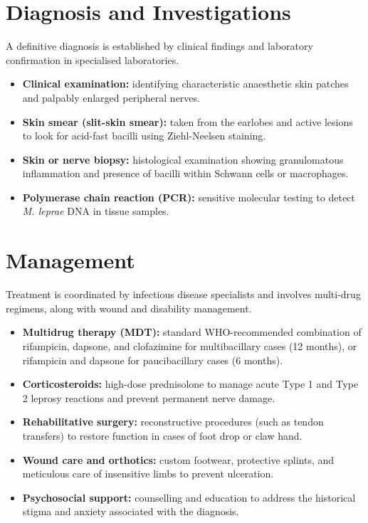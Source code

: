 \section*{Diagnosis and Investigations}
A definitive diagnosis is established by clinical findings and laboratory confirmation in specialised laboratories.
\begin{itemize}
    \item \textbf{Clinical examination:} identifying characteristic anaesthetic skin patches and palpably enlarged peripheral nerves.
    \item \textbf{Skin smear (slit-skin smear):} taken from the earlobes and active lesions to look for acid-fast bacilli using Ziehl-Neelsen staining.
    \item \textbf{Skin or nerve biopsy:} histological examination showing granulomatous inflammation and presence of bacilli within Schwann cells or macrophages.
    \item \textbf{Polymerase chain reaction (PCR):} sensitive molecular testing to detect \textit{M. leprae} DNA in tissue samples.
\end{itemize}

\section*{Management}
Treatment is coordinated by infectious disease specialists and involves multi-drug regimens, along with wound and disability management.
\begin{itemize}
    \item \textbf{Multidrug therapy (MDT):} standard WHO-recommended combination of rifampicin, dapsone, and clofazimine for multibacillary cases (12 months), or rifampicin and dapsone for paucibacillary cases (6 months).
    \item \textbf{Corticosteroids:} high-dose prednisolone to manage acute Type 1 and Type 2 leprosy reactions and prevent permanent nerve damage.
    \item \textbf{Rehabilitative surgery:} reconstructive procedures (such as tendon transfers) to restore function in cases of foot drop or claw hand.
    \item \textbf{Wound care and orthotics:} custom footwear, protective splints, and meticulous care of insensitive limbs to prevent ulceration.
    \item \textbf{Psychosocial support:} counselling and education to address the historical stigma and anxiety associated with the diagnosis.
\end{itemize}

